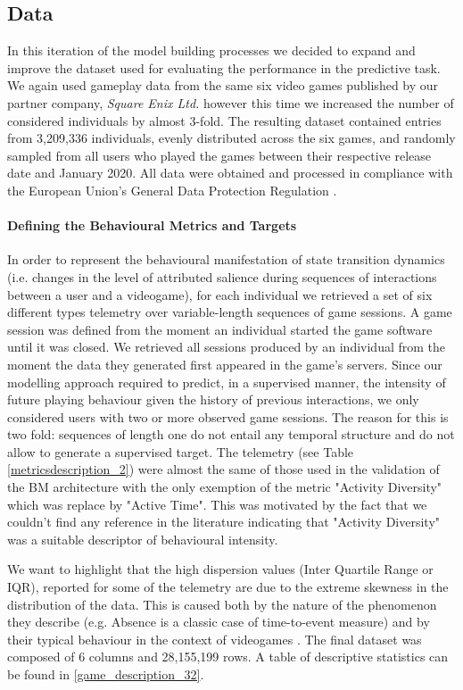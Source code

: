 \subsection{Data}
\label{data_2}
In this iteration of the model building processes we decided to expand and improve the dataset used for evaluating the performance in the predictive task. We again used gameplay data from the same six video games published by our partner company, \textit{Square Enix Ltd.} however this time we increased the number of considered individuals by almost 3-fold. The resulting dataset contained entries from 3,209,336 individuals, evenly distributed across the six games, and randomly sampled from all users who played the games between their respective release date and January 2020. All data were obtained and processed in compliance with the European Union's General Data Protection Regulation \cite{EUdataregulations2018}. 
\paragraph*{Defining the Behavioural Metrics and Targets}
In order to represent the behavioural manifestation of state transition dynamics (i.e. changes in the level of attributed salience during sequences of interactions between a user and a videogame), for each individual we retrieved a set of six different types telemetry over variable-length sequences of game sessions. A game session was defined from the moment an individual started the game software until it was closed. We retrieved all sessions produced by an individual from the moment the data they generated first appeared in the game's servers. Since our modelling approach required to predict, in a supervised manner, the intensity of future playing behaviour given the history of previous interactions, we only considered users with two or more observed game sessions. The reason for this is two fold: sequences of length one do not entail any temporal structure and do not allow to generate a supervised target. The telemetry (see Table \ref{metricsdescription_2}) were almost the same of those used in the validation of the BM architecture with the only exemption of the metric "Activity Diversity" which was replace by "Active Time". This was motivated by the fact that we couldn't find any reference in the literature indicating that "Activity Diversity" was a suitable descriptor of behavioural intensity. 

We want to highlight that the high dispersion values (Inter Quartile Range  or IQR), reported for some of the telemetry are due to the extreme skewness in the distribution of the data. This is caused both by the nature of the phenomenon they describe (e.g. Absence is a classic case of time-to-event measure) and by their typical behaviour in the context of videogames \cite{bauckhage2012players}. The final dataset was composed of 6 columns and 28,155,199 rows. A table of descriptive statistics can be found in \ref{game_description_32}.

